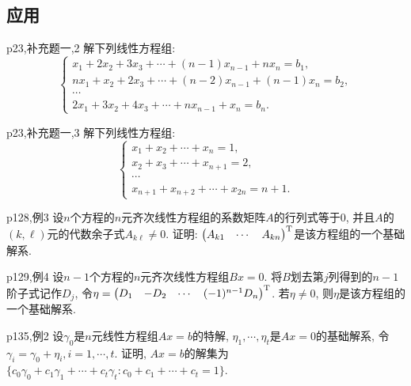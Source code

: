 \subsection*{应用}

\begin{example}{p23,补充题一,2}
	解下列线性方程组: $$\begin{cases}
		x_1+2x_2+3x_3+\cdots +(n-1)x_{n-1}+nx_n=b_1, \\ 
		nx_1+x_2+2x_3+\cdots +(n-2)x_{n-1}+(n-1)x_n=b_2, \\
		\cdots \\
		2x_1+3x_2+4x_3+\cdots +nx_{n-1}+x_n=b_n.
	\end{cases}$$
\end{example}

\begin{example}{p23,补充题一,3}
	解下列线性方程组: $$\begin{cases}
		x_1+x_2+\cdots +x_n=1, \\
		x_2+x_3+\cdots +x_{n+1}=2, \\
		\cdots \\
		x_{n+1}+x_{n+2}+\cdots +x_{2n}=n+1.
	\end{cases}$$
\end{example}

\begin{example}{p128,例3}
	设$n$个方程的$n$元齐次线性方程组的系数矩阵$A$的行列式等于$0$, 并且$A$的$(k,\ell)$元的代数余子式$A_{k\ell} \neq 0$. 证明: $\begin{pmatrix}
		A_{k1} & \cdots & A_{kn}
	\end{pmatrix}^{\operatorname{T}}$是该方程组的一个基础解系. 
\end{example}

\begin{example}{p129,例4}
	设$n-1$个方程的$n$元齐次线性方程组$Bx=0$. 将$B$划去第$j$列得到的$n-1$阶子式记作$D_j$, 令$\eta = \begin{pmatrix}
		D_1 & -D_2 & \cdots & (-1)^{n-1}D_n
	\end{pmatrix}^{\operatorname{T}}$. 若$\eta \neq 0$, 则$\eta$是该方程组的一个基础解系. 
\end{example}

\begin{example}{p135,例2}
	设$\gamma _0$是$n$元线性方程组$Ax=b$的特解, $\eta _1,\cdots ,\eta _t$是$Ax=0$的基础解系, 令$\gamma _i=\gamma _0+\eta _i,i=1,\cdots ,t$. 证明, $Ax=b$的解集为$\{ c_0\gamma _0+c_1\gamma _1+\cdots + c_t\gamma _t:c_0+c_1+\cdots +c_t=1 \}$. 
\end{example}

